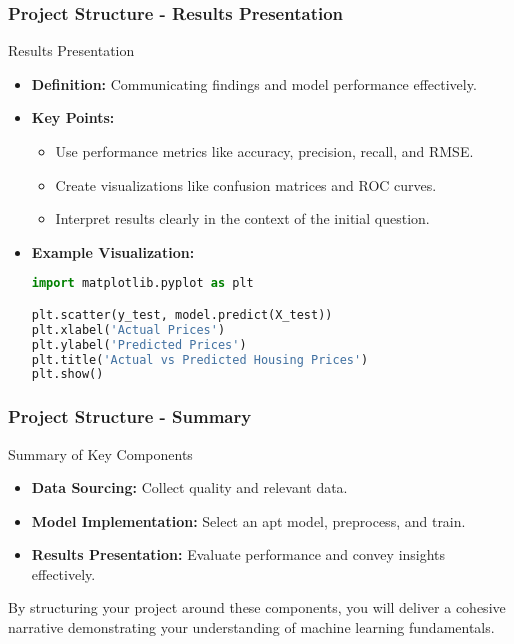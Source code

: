 \documentclass[aspectratio=169]{beamer}
\begin{document}
\begin{frame}[fragile]
    \frametitle{Project Structure - Results Presentation}
    \begin{block}{Results Presentation}
        \begin{itemize}
            \item \textbf{Definition:} Communicating findings and model performance effectively.
            \item \textbf{Key Points:}
                \begin{itemize}
                    \item Use performance metrics like accuracy, precision, recall, and RMSE.
                    \item Create visualizations like confusion matrices and ROC curves.
                    \item Interpret results clearly in the context of the initial question.
                \end{itemize}
            \item \textbf{Example Visualization:}
            \begin{lstlisting}[language=Python]
import matplotlib.pyplot as plt

plt.scatter(y_test, model.predict(X_test))
plt.xlabel('Actual Prices')
plt.ylabel('Predicted Prices')
plt.title('Actual vs Predicted Housing Prices')
plt.show()
            \end{lstlisting}
        \end{itemize}
    \end{block}
\end{frame}

\begin{frame}[fragile]
    \frametitle{Project Structure - Summary}
    \begin{block}{Summary of Key Components}
        \begin{itemize}
            \item \textbf{Data Sourcing:} Collect quality and relevant data.
            \item \textbf{Model Implementation:} Select an apt model, preprocess, and train.
            \item \textbf{Results Presentation:} Evaluate performance and convey insights effectively.
        \end{itemize}
    \end{block}
    By structuring your project around these components, you will deliver a cohesive narrative demonstrating your understanding of machine learning fundamentals.
\end{frame}
\end{document}
